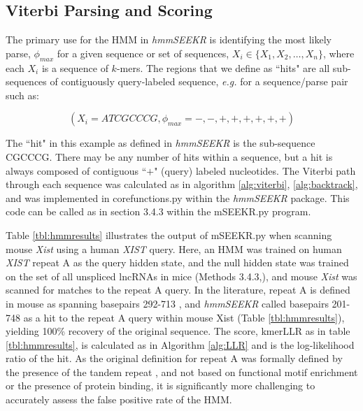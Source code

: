\subsection{Viterbi Parsing and Scoring}
The primary use for the HMM in \emph{hmmSEEKR} is identifying the most likely parse, $\phi_{max}$ for a given sequence or set of sequences, $X_i \in \{X_1,X_2,\dots,X_n\}$, where each $X_i$ is a sequence of $k$-mers. The regions that we define as ``hits" are all sub-sequences of contiguously query-labeled sequence, \emph{e.g.} for a sequence/parse pair such as:

$$(X_i=ATCGCCCG,\phi_{max}=-,-,+,+,+,+,+,+)$$

The ``hit" in this example as defined in \emph{hmmSEEKR} is the sub-sequence CGCCCG. There may be any number of hits within a sequence, but a hit is always composed of contiguous ``$+$" (query) labeled nucleotides.  The Viterbi path through each sequence was calculated as in algorithm \ref{alg:viterbi}, \ref{alg:backtrack}, and was implemented in corefunctions.py within the \emph{hmmSEEKR} package. This code can be called as in section 3.4.3 within the mSEEKR.py program.

Table \ref{tbl:hmmresults} illustrates the output of mSEEKR.py when scanning mouse \emph{Xist} using a human \emph{XIST} query. Here, an HMM was trained on human \emph{XIST} repeat A as the query hidden state, and the null hidden state was trained on the set of all unspliced lncRNAs in  mice (Methods 3.4.3,\cite{Derrien2012TheExpression}), and mouse \emph{Xist} was scanned for matches to the repeat A query. In the literature, repeat A is defined in mouse as spanning basepairs 292-713 \cite{Brockdorff10TheNucleus.}, and \emph{hmmSEEKR} called basepairs 201-748 as a hit to the repeat A query within mouse Xist (Table \ref{tbl:hmmresults}), yielding 100\% recovery of the original sequence. The score, kmerLLR as in table \ref{tbl:hmmresults}, is calculated as in Algorithm \ref{alg:LLR} and is the log-likelihood ratio of the hit. As the original definition for repeat A was formally defined by the presence of the tandem repeat \cite{Brockdorff10TheNucleus.,Brown10TheNucleus.}, and not based on functional motif enrichment or the presence of protein binding, it is significantly more challenging to accurately assess the false positive rate of the HMM.


